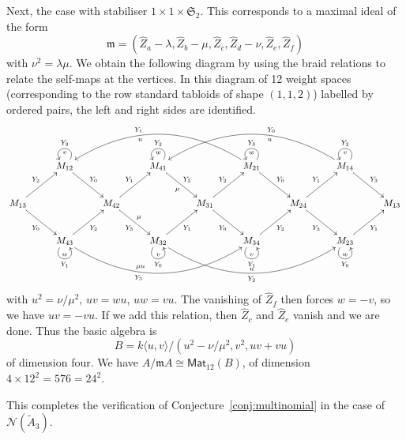 \documentclass[12pt]{amsart}
\newcommand{\Mat}{\mathsf{Mat}}
\newcommand{\sym}[1]{\mathfrak{S}_{#1}}
\newcommand{\mcN}{\mathcal{N}}
\newcommand{\mfm}{\mathfrak{m}}
\numberwithin{equation}{section}
\theoremstyle{definition}
\begin{document}
Next, the case with stabiliser $1\times 1 \times \sym{2}$. This
corresponds to a maximal ideal of the form
\[ \mfm=(\hat Z_a-\lambda,\hat Z_b-\mu,\hat Z_c,\hat
  Z_d-\nu,\hat Z_e,\hat Z_f) \]
with $\nu^2=\lambda\mu$. We obtain  the
following diagram by using the braid relations to relate the self-maps
at the vertices. In  this diagram of 12 weight spaces (corresponding to the row standard tabloids of shape $(1,1,2)$) labelled by ordered pairs, the left and right sides are identified.
\[ \xymatrix@=9mm{ &
M_{12}\ar[dr]^{Y_0}\ar@(ur,ul)[]_{Y_3}^v&&
M_{41}\ar[dr]^{Y_3}_\mu\ar@(ur,ul)[]_{Y_2}^w&&
M_{21}\ar[dr]^{Y_0}\ar@(ur,ul)[]_{Y_3}^w\ar@/_8ex/[llll]_(.6){Y_1}^(.6)u&&
M_{14}\ar[dr]^{Y_3}\ar@(ur,ul)[]_{Y_2}^v\ar@/_8ex/[llll]_(.4){Y_0}^(.4)u\\
M_{13}\ar[ur]^{Y_2}\ar[dr]_{Y_0}&&
M_{42}\ar[ur]^{Y_1}\ar[dr]_{Y_3}^\mu&&
M_{31}\ar[ur]^{Y_2}\ar[dr]_{Y_0}&&
M_{24}\ar[ur]^{Y_1}\ar[dr]_{Y_3}&&
M_{13}\\ &
M_{43}\ar[ur]_{Y_2}\ar@(dl,dr)[]_{Y_1}^w\ar@/_8ex/[rrrr]_(.4){Y_3}^(.4){\mu u}&&
M_{32}\ar[ur]_{Y_1}\ar@(dl,dr)[]_{Y_0}^v\ar@/_8ex/[rrrr]_{Y_2}^u&&
M_{34}\ar[ur]_{Y_2}\ar@(dl,dr)[]_{Y_1}^v&&
M_{23}\ar[ur]_{Y_1}\ar@(dl,dr)[]_{Y_0}^w} \]
with $u^2=\nu/\mu^2$, $uv=wu$, $uw=vu$. The vanishing of $\hat Z_f$
then forces $w=-v$, so we have $uv=-vu$. If we add this relation, then
$\hat Z_c$ and $\hat Z_e$ vanish and we are done. Thus the basic algebra is
\[ B=k\langle u,v\rangle/(u^2-\nu/\mu^2, v^2, uv+vu) \]
of dimension four. We have $A/\mfm A\cong \Mat_{12}(B)$, of dimension
$4\times 12^2=576=24^2$.\bigskip

This completes the verification of Conjecture~\ref{conj:multinomial}
in the case of $\mcN(\tilde A_3)$.









\end{document}
